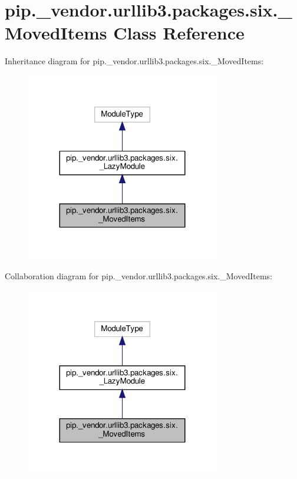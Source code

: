 \hypertarget{classpip_1_1__vendor_1_1urllib3_1_1packages_1_1six_1_1__MovedItems}{}\section{pip.\+\_\+vendor.\+urllib3.\+packages.\+six.\+\_\+\+Moved\+Items Class Reference}
\label{classpip_1_1__vendor_1_1urllib3_1_1packages_1_1six_1_1__MovedItems}


Inheritance diagram for pip.\+\_\+vendor.\+urllib3.\+packages.\+six.\+\_\+\+Moved\+Items\+:
\nopagebreak
\begin{figure}[H]
\begin{center}
\leavevmode
\includegraphics[width=239pt]{classpip_1_1__vendor_1_1urllib3_1_1packages_1_1six_1_1__MovedItems__inherit__graph}
\end{center}
\end{figure}


Collaboration diagram for pip.\+\_\+vendor.\+urllib3.\+packages.\+six.\+\_\+\+Moved\+Items\+:
\nopagebreak
\begin{figure}[H]
\begin{center}
\leavevmode
\includegraphics[width=239pt]{classpip_1_1__vendor_1_1urllib3_1_1packages_1_1six_1_1__MovedItems__coll__graph}
\end{center}
\end{figure}
